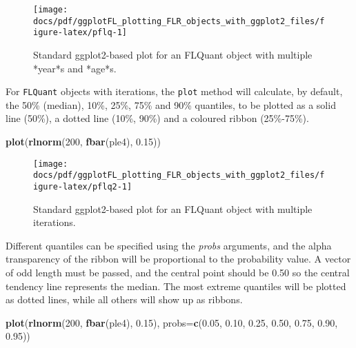 \documentclass[]{article}
\newenvironment{Shaded}{\begin{snugshade}}{\end{snugshade}}
\newcommand{\KeywordTok}[1]{\textcolor[rgb]{0.13,0.29,0.53}{\textbf{{#1}}}}
\newcommand{\DataTypeTok}[1]{\textcolor[rgb]{0.13,0.29,0.53}{{#1}}}
\newcommand{\DecValTok}[1]{\textcolor[rgb]{0.00,0.00,0.81}{{#1}}}
\newcommand{\FloatTok}[1]{\textcolor[rgb]{0.00,0.00,0.81}{{#1}}}
\newcommand{\NormalTok}[1]{{#1}}
\begin{document}
\begin{figure}

{\centering \texttt{[image: docs/pdf/ggplotFL\_plotting\_FLR\_objects\_with\_ggplot2\_files/figure-latex/pflq-1]} 

}

\caption{Standard ggplot2-based plot for an FLQuant object with multiple *year*s and *age*s.}\label{fig:pflq}
\end{figure}

For \texttt{FLQuant} objects with iterations, the \texttt{plot} method
will calculate, by default, the 50\% (median), 10\%, 25\%, 75\% and 90\%
quantiles, to be plotted as a solid line (50\%), a dotted line (10\%,
90\%) and a coloured ribbon (25\%-75\%).

\begin{Shaded}
\begin{Highlighting}[]
\KeywordTok{plot}\NormalTok{(}\KeywordTok{rlnorm}\NormalTok{(}\DecValTok{200}\NormalTok{, }\KeywordTok{fbar}\NormalTok{(ple4), }\FloatTok{0.15}\NormalTok{))}
\end{Highlighting}
\end{Shaded}

\begin{figure}

{\centering \texttt{[image: docs/pdf/ggplotFL\_plotting\_FLR\_objects\_with\_ggplot2\_files/figure-latex/pflq2-1]} 

}

\caption{Standard ggplot2-based plot for an FLQuant object with multiple iterations.}\label{fig:pflq2}
\end{figure}

Different quantiles can be specified using the \emph{probs} arguments,
and the alpha transparency of the ribbon will be proportional to the
probability value. A vector of odd length must be passed, and the
central point should be 0.50 so the central tendency line represents the
median. The most extreme quantiles will be plotted as dotted lines,
while all others will show up as ribbons.

\begin{Shaded}
\begin{Highlighting}[]
\KeywordTok{plot}\NormalTok{(}\KeywordTok{rlnorm}\NormalTok{(}\DecValTok{200}\NormalTok{, }\KeywordTok{fbar}\NormalTok{(ple4), }\FloatTok{0.15}\NormalTok{), }\DataTypeTok{probs=}\KeywordTok{c}\NormalTok{(}\FloatTok{0.05}\NormalTok{, }\FloatTok{0.10}\NormalTok{, }\FloatTok{0.25}\NormalTok{, }\FloatTok{0.50}\NormalTok{, }\FloatTok{0.75}\NormalTok{, }\FloatTok{0.90}\NormalTok{, }\FloatTok{0.95}\NormalTok{))}
\end{Highlighting}
\end{Shaded}
\end{document}

